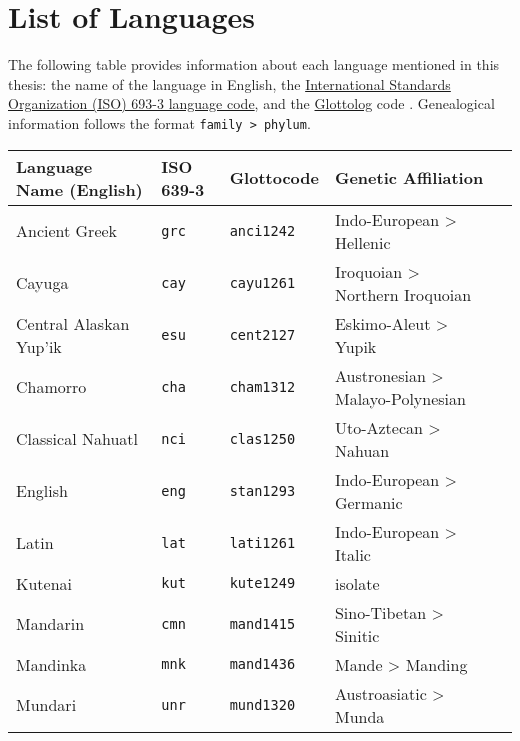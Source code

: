 \chapter*{List of Languages}
\label{ch:languages}

The following table provides information about each language mentioned in this thesis: the name of the language in English, the \href{https://iso639-3.sil.org/}{International Standards Organization (ISO) 693-3 language code}, and the \href{https://glottolog.org/}{Glottolog} code \parencite{HammarstromForkelHaspelmath2019}. Genealogical information follows the format \texttt{family > phylum}.

\renewcommand{\arraystretch}{1}

\begin{longtable}[h]{ l l l l l }
  \onehalfspacing
  \textbf{Language Name (English)} & \textbf{ISO 639-3} & \textbf{Glottocode} & \textbf{Genetic Affiliation}\\
  \midrule
  Ancient Greek                    & \texttt{grc}       & \texttt{anci1242}   & Indo-European > Hellenic\\
  Cayuga                           & \texttt{cay}       & \texttt{cayu1261}   & Iroquoian > Northern Iroquoian\\
  Central Alaskan Yup'ik           & \texttt{esu}       & \texttt{cent2127}   & Eskimo-Aleut > Yupik\\
  Chamorro                         & \texttt{cha}       & \texttt{cham1312}   & Austronesian > Malayo-Polynesian\\
  Classical Nahuatl                & \texttt{nci}       & \texttt{clas1250}   & Uto-Aztecan > Nahuan\\
  English                          & \texttt{eng}       & \texttt{stan1293}   & Indo-European > Germanic\\
  Latin                            & \texttt{lat}       & \texttt{lati1261}   & Indo-European > Italic\\
  Kutenai                          & \texttt{kut}       & \texttt{kute1249}   & isolate\\
  Mandarin                         & \texttt{cmn}       & \texttt{mand1415}   & Sino-Tibetan > Sinitic\\
  Mandinka                         & \texttt{mnk}       & \texttt{mand1436}   & Mande > Manding\\
  Mundari                          & \texttt{unr}       & \texttt{mund1320}   & Austroasiatic > Munda\\

\end{longtable}
